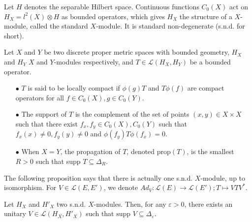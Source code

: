 \begin{Expl}
Let $H$ denotes the separable Hilbert space. Continuous functions $C_0(X)$ act on $H_X =l^2(X)\otimes H$ as bounded operators, which gives $H_X$ the structure of a $X$-module, called the standard $X$-module. It is standard non-degenerate (s.n.d. for short).  
\end{Expl}

\begin{definition}
Let $X$ and $Y$ be two discrete proper metric spaces with bounded geometry, $H_X$ and $H_Y$ $X$ and $Y$-modules respectively, and $T\in \mathcal L(H_X, H_Y)$ be a bounded operator.
\begin{itemize}
\item[$\bullet$] $T$ is said to be locally compact if $\phi(g)T$ and $T\phi(f)$ are compact operators for all $f\in C_0(X),g\in C_0(Y)$.
\item[$\bullet$] The support of $T$ is the complement of the set of points $(x,y)\in X\times X$ such that there exist $f_x,f_y\in C_0(X),C_0(Y)$ such that $f_x(x)\neq 0,f_{y}(y)\neq 0$ and $\phi(f_{y}) T \phi(f_x)=0$.
\item[$\bullet$] When $X=Y$, the propagation of $T$, denoted prop$(T)$, is the smallest $R>0$ such that supp $T \subseteq \Delta_R$.
\end{itemize}
\end{definition}

The following proposition says that there is actually one s.n.d. $X$-module, up to isomorphism. For $V\in\mathcal L(E,E')$, we denote $Ad_V : \mathcal L(E) \rightarrow \mathcal L(E') ; T\mapsto VTV^*$.

\begin{prop}\label{SND}
Let $H_X$ and $H'_X$ two s.n.d. $X$-modules. Then, for any $\varepsilon>0$, there exists an unitary $V\in\mathcal L(H_X,H'_X)$ such that $\text{supp }V \subseteq \Delta_\varepsilon$.
\end{prop}

